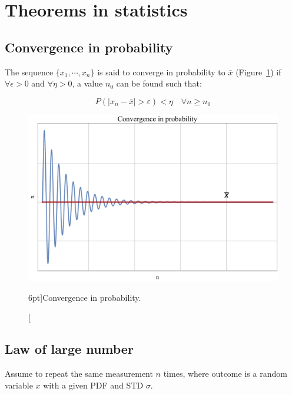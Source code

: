 

\section{Theorems in statistics}
\label{sec:theorem_in_stat}

\subsection{Convergence in probability}
\label{subsec:convergence_in_prob}

The sequence $\{ x_{1}, \cdots, x_{n} \}$ is said to converge in probability to $\bar{x}$ (Figure~\ref{fig:convergence}) if $\forall \epsilon > 0$ and $\forall \eta > 0$, a value $n_{0}$ can be found such that:

\begin{equation}\label{eq:convergence_in_prob}
	P(|x_{n} - \bar{x}| > \varepsilon) < \eta \quad \forall n \geq n_{0}
\end{equation}

\begin{figure}
	\includegraphics{monte_carlo/convergence.pdf}
	\caption[Convergence in probability.][6pt]{Convergence in probability.}
	\label{fig:convergence}
\end{figure}

\subsection{Law of large number}
\label{subsec:law_of_large_number}

Assume to repeat the same measurement $n$ times, where outcome is a random variable $x$ with a given PDF and STD $\sigma$.

